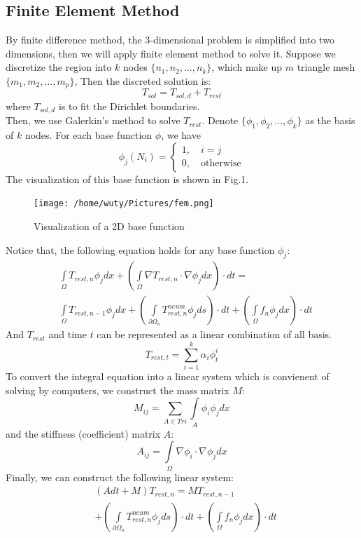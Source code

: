 \documentclass[conference]{IEEEtran}
\begin{document}
    \subsection{Finite Element Method}
    By finite difference method, the 3-dimensional problem is simplified into two dimensions, then we will apply finite 
    element method to solve it.
    Suppose we discretize the region into $k$ nodes $\{n_1, n_2,\ldots, n_k\}$, which make up $m$ triangle mesh $\{m_1, m_2,\ldots,  m_p\}$, 
    Then the discreted solution is:
    $$T_{sol} = T_{sol, d} + T_{rest}$$
    where $T_{sol, d}$ is to fit the Dirichlet boundaries.\\
    Then, we use Galerkin's method to solve $T_{rest}$. Denote $\{\phi_1, \phi_2, \ldots, \phi_k\}$ as the basis of $k$ nodes. 
    For each base function $\phi$, we have
    $$\phi_j(N_i) = \begin{cases} 1, \quad i = j\\ 0, \quad \text{otherwise}\end{cases}$$
    The visualization of this base function is shown in Fig.1.\cite{b2} 
    \newpage
    \begin{figure}[h]
        \centering
        \texttt{[image: /home/wuty/Pictures/fem.png]}
        \caption{Visualization of a 2D base function}
    \end{figure}
    Notice that, the following equation holds for any base function $\phi_j$:
    \begin{equation}\nonumber
        \begin{aligned}
            & \int\limits_\Omega T_{rest, n} \phi_j dx+(\int\limits_\Omega \nabla T_{rest, n} \cdot \nabla \phi_j dx) \cdot dt =\\
            & \int\limits_\Omega T_{rest, n-1}\phi_j dx+(\int\limits_{\partial\Omega_n} T_{rest, n}^{neum} \phi_jds)\cdot dt+(\int\limits_\Omega f_n \phi_j dx)\cdot dt
        \end{aligned}
    \end{equation}
    And $T_{rest}$ and time $t$ can be represented as a linear combination of all basis.
    $$T_{rest, t} = \sum_{i=1}^{k}\alpha_i\phi^{i}_{t}$$
    To convert the integral equation into a linear system which is convienent of solving by computers, we construct the mass matrix $M$:
    $$M_{ij} = \sum\limits_{A\in Tri} \int\limits_A \phi_i  \phi_j dx$$
    and the stiffness (coefficient) matrix $A$:
    $$A_{ij} = \int\limits_\Omega\nabla \phi_i \cdot \nabla \phi_j dx$$
    Finally, we can construct the following linear system:
    \begin{equation}\nonumber
        \begin{aligned}
        & (Adt+M)T_{rest,n} = MT_{rest,n-1} \\
        & +(\int\limits_{\partial\Omega_n} T_{rest, n}^{neum} \phi_jds)\cdot dt+(\int\limits_\Omega f_n \phi_j dx)\cdot dt
        \end{aligned}
    \end{equation}
    
\end{document}

